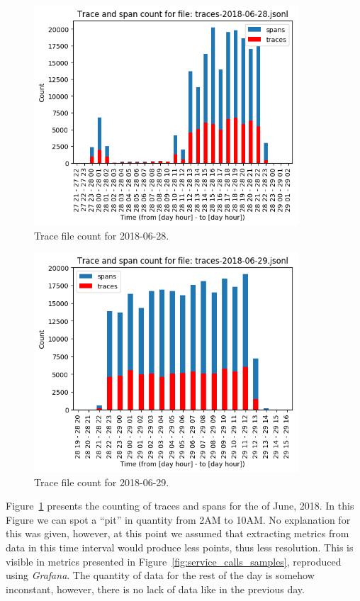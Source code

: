 \begin{figure}[H]
    \centering
    \includegraphics[width=0.88\textwidth]{images/trace_file_count_2018_06_28_chart.png}
    \caption{Trace file count for 2018-06-28.}
    \label{fig:trace_file_count_2018_06_28}
\end{figure}

\begin{figure}[H]
    \centering
    \includegraphics[width=0.88\textwidth]{images/trace_file_count_2018_06_29_chart.png}
    \caption{Trace file count for 2018-06-29.}
    \label{fig:trace_file_count_2018_06_29}
\end{figure}

Figure~\ref{fig:trace_file_count_2018_06_28} presents the counting of traces and spans for the  of June, 2018. In this Figure we can spot a ``pit'' in quantity from 2AM to 10AM. No explanation for this was given, however, at this point we assumed that extracting metrics from data in this time interval would produce less points, thus less resolution. This is visible in metrics presented in Figure~\ref{fig:service_calls_samples}, reproduced using \emph{Grafana}. The quantity of data for the rest of the day is somehow inconstant, however, there is no lack of data like in the previous day.

